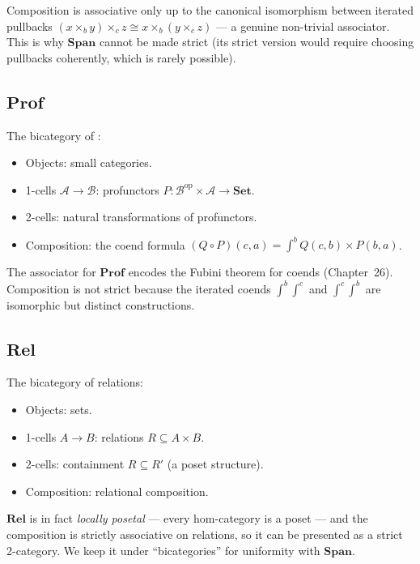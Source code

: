 \begin{remark}
Composition is associative only up to the canonical isomorphism between
iterated pullbacks $(x \times_b y) \times_c z \cong x \times_b (y \times_c z)$
— a genuine non-trivial associator. This is why $\mathbf{Span}$ cannot be
made strict (its strict version would require choosing pullbacks coherently,
which is rarely possible).
\end{remark}

\subsection{$\mathbf{Prof}$}

The bicategory of :
\begin{itemize}
  \item Objects: small categories.
  \item 1-cells $\mathcal{A} \to \mathcal{B}$: profunctors $P :
        \mathcal{B}^{\mathrm{op}} \times \mathcal{A} \to \mathbf{Set}$.
  \item 2-cells: natural transformations of profunctors.
  \item Composition: the coend formula $(Q \circ P)(c, a) = \int^{b}
        Q(c, b) \times P(b, a)$.
\end{itemize}

The associator for $\mathbf{Prof}$ encodes the Fubini theorem for coends
(Chapter~26). Composition is not strict because the iterated coends
$\int^b \int^c$ and $\int^c \int^b$ are isomorphic but distinct constructions.

\subsection{$\mathbf{Rel}$}

The bicategory of relations:
\begin{itemize}
  \item Objects: sets.
  \item 1-cells $A \to B$: relations $R \subseteq A \times B$.
  \item 2-cells: containment $R \subseteq R'$ (a poset structure).
  \item Composition: relational composition.
\end{itemize}

$\mathbf{Rel}$ is in fact \emph{locally posetal} — every hom-category is a
poset — and the composition is strictly associative on relations, so it can
be presented as a strict 2-category. We keep it under ``bicategories'' for
uniformity with $\mathbf{Span}$.

